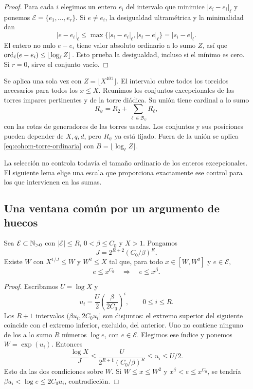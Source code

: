 \begin{proof}
Para cada $i$ elegimos un entero $e_i$ del intervalo
que minimice $|s_i-e_i|_\ell$ y ponemos
$\mathcal E=\{e_1,\ldots,e_r\}$.
Si $e\ne e_i$, la desigualdad ultramétrica y la
minimalidad dan
\[
 |e-e_i|_\ell
 \le\max\{|s_i-e_i|_\ell,|s_i-e|_\ell\}
 =|s_i-e|_\ell.
\]
El entero no nulo $e-e_i$ tiene valor absoluto
ordinario a lo sumo $Z$, así que
$\operatorname{ord}_\ell(e-e_i)\le\lfloor\log_\ell Z\rfloor$.
Esto prueba la desigualdad, incluso si el mínimo es
cero. Si $r=0$, sirve el conjunto vacío.
\end{proof}

Se aplica una sola vez con $Z=\lfloor X^{401}\rfloor$.
El intervalo cubre todos los torcidos necesarios para
todos los $x\le X$.
Reunimos los conjuntos excepcionales de las torres
impares pertinentes y de la torre diádica.
Su unión tiene cardinal a lo sumo
\[
 R_\psi=R_2+\sum_{\ell\in\mathcal B_\psi}R_\ell,
\]
con las cotas de generadores de las torres usadas.
Los conjuntos y sus posiciones pueden depender de
$X,q,d$, pero $R_\psi$ ya está fijado.
Fuera de la unión se aplica
\eqref{eq:cohom-torre-ordinaria} con
$B=\lfloor\log_\ell Z\rfloor$.

La selección no controla todavía el tamaño ordinario
de los enteros excepcionales. El siguiente lema
elige una escala que proporciona exactamente ese
control para los que intervienen en las sumas.

\subsection{Una ventana común por un argumento de huecos}

\begin{lema}
\label{lem:cohom-ventana}
Sea $\mathcal E\subset\mathbb{N}_{>0}$ con $|\mathcal E|\le R$,
$0<\beta\le C_0$ y $X>1$.
Pongamos
\[
 J=2^{R+2}(C_0/\beta)^R.
\]
Existe $W$ con $X^{1/J}\le W$ y $W^2\le X$ tal que,
para todo $x\in[W,W^2]$ y $e\in\mathcal E$,
\[
 e\le x^{C_0}\quad\Longrightarrow\quad e\le x^\beta.
\]
\end{lema}

\begin{proof}
Escribamos $U=\log X$ y
\[
 u_i=\frac U2\left(\frac{\beta}{2C_0}\right)^i,
 \qquad 0\le i\le R.
\]
Los $R+1$ intervalos $(\beta u_i,2C_0u_i]$ son
disjuntos: el extremo superior del siguiente coincide
con el extremo inferior, excluido, del anterior.
Uno no contiene ninguno de los a lo sumo $R$ números
$\log e$, con $e\in\mathcal E$.
Elegimos ese índice y ponemos $W=\exp(u_i)$.
Entonces
\[
 \frac{\log X}{J}
 \le\frac{U}{2^{R+1}(C_0/\beta)^R}
 \le u_i\le U/2.
\]
Esto da las dos condiciones sobre $W$.
Si $W\le x\le W^2$ y
$x^\beta<e\le x^{C_0}$, se tendría
$\beta u_i<\log e\le2C_0u_i$, contradicción.
\end{proof}

